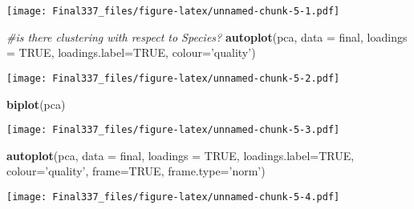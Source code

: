 \documentclass[
]{article}
\newenvironment{Shaded}{\begin{snugshade}}{\end{snugshade}}
\newcommand{\CommentTok}[1]{\textcolor[rgb]{0.56,0.35,0.01}{\textit{#1}}}
\newcommand{\DataTypeTok}[1]{\textcolor[rgb]{0.13,0.29,0.53}{#1}}
\newcommand{\KeywordTok}[1]{\textcolor[rgb]{0.13,0.29,0.53}{\textbf{#1}}}
\newcommand{\NormalTok}[1]{#1}
\newcommand{\OtherTok}[1]{\textcolor[rgb]{0.56,0.35,0.01}{#1}}
\newcommand{\StringTok}[1]{\textcolor[rgb]{0.31,0.60,0.02}{#1}}
\begin{document}
\texttt{[image: Final337\_files/figure-latex/unnamed-chunk-5-1.pdf]}

\begin{Shaded}
\begin{Highlighting}[]
\CommentTok{#is there clustering with respect to Species?}
\KeywordTok{autoplot}\NormalTok{(pca, }\DataTypeTok{data =}\NormalTok{ final, }\DataTypeTok{loadings =} \OtherTok{TRUE}\NormalTok{, }\DataTypeTok{loadings.label=}\OtherTok{TRUE}\NormalTok{, }\DataTypeTok{colour=}\StringTok{'quality'}\NormalTok{)}
\end{Highlighting}
\end{Shaded}

\texttt{[image: Final337\_files/figure-latex/unnamed-chunk-5-2.pdf]}

\begin{Shaded}
\begin{Highlighting}[]
\KeywordTok{biplot}\NormalTok{(pca)}
\end{Highlighting}
\end{Shaded}

\texttt{[image: Final337\_files/figure-latex/unnamed-chunk-5-3.pdf]}

\begin{Shaded}
\begin{Highlighting}[]
\KeywordTok{autoplot}\NormalTok{(pca, }\DataTypeTok{data =}\NormalTok{ final, }\DataTypeTok{loadings =} \OtherTok{TRUE}\NormalTok{, }\DataTypeTok{loadings.label=}\OtherTok{TRUE}\NormalTok{, }\DataTypeTok{colour=}\StringTok{'quality'}\NormalTok{, }\DataTypeTok{frame=}\OtherTok{TRUE}\NormalTok{, }\DataTypeTok{frame.type=}\StringTok{'norm'}\NormalTok{)}
\end{Highlighting}
\end{Shaded}

\texttt{[image: Final337\_files/figure-latex/unnamed-chunk-5-4.pdf]}
\end{document}
